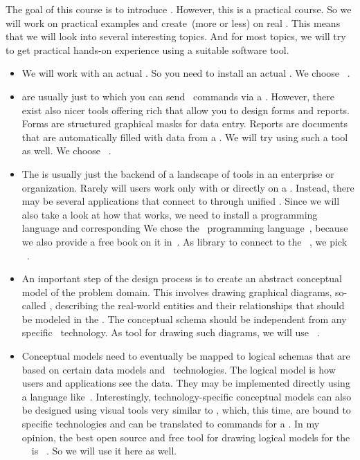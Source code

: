 %
%
%
The goal of this course is to introduce .
However, this is a practical course.
So we will work on practical examples and create~(more or less)   on real .
This means that we will look into several interesting topics.
And for most topics, we will try to get practical hands-on experience using a suitable software tool.%
%
\begin{itemize}%
%
\item We will work with an actual .
So you need to install an actual .
We choose \postgresql~\cite{TA2024DDAMWPAM,FP2023LP,OH2017PUAR,B2024PELUYDW}.%
%
\item {} are usually just  to which you can send \sql\ commands via a  .
However, there exist also nicer tools offering rich  that allow you to design forms and reports.
Forms are structured graphical masks for data entry.
Reports are documents that are automatically filled with data from a \db.
We will try using such a tool as well.
We choose \libreofficeBase~\cite{FNFHWSKLSSGLFRSRPLJG2022BG7R1BOL7C,S2022L7PFEUU}.%
%
\item The  is usually just the backend of a landscape of tools in an enterprise or organization.
Rarely will users work only with or directly on a .
Instead, there may be several applications that connect to  through unified .
Since we will also take a look at how that works, we need to install a programming language and corresponding 
We chose the \python\ programming language~\cite{K2018EIPFEUU,A2002PC,H2023ABGTP3P,LH2015DSAAWP}, because we also provide a free book on it in~\cite{programmingWithPython}.
As library to connect to the \postgresql\ , we pick \psycopg~\cite{VDGE2010P}.%
%
\item An important step of the  design process is to create an abstract conceptual model of the problem domain.
This involves drawing graphical diagrams, so-called , describing the real-world entities and their relationships that should be modeled in the \db.
The conceptual schema should be independent from any specific \dbms\ technology.
As tool for drawing such diagrams, we will use \yEd~\cite{SG2015MDAWY,Y2011YGEM}.%
%
\item Conceptual models need to eventually be mapped to logical schemas that are based on certain data models and \db\ technologies.
The logical model is how users and applications see the data.
They may be implemented directly using a language like~\sql.
Interestingly, technology-specific conceptual models can also be designed using visual tools very similar to , which, this time, are bound to specific technologies and can be translated to commands for a \dbms.
In my opinion, the best open source and free tool for drawing logical models for the \postgresql\ \dbms\ is \pgmodeler~\cite{AES2006PPDM}. %
So we will use it here as well.%
%
\end{itemize}%
